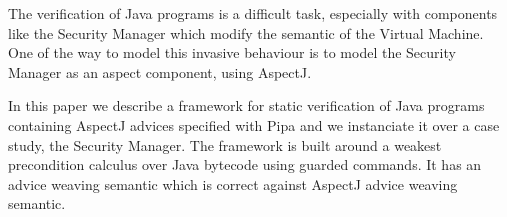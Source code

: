 The verification of Java programs is a difficult task, especially with
components like the Security Manager which modify the semantic of the
Virtual Machine.  One of the way to model this invasive behaviour is
to model the Security Manager as an aspect component, using AspectJ.

In this paper we describe a framework for static verification of Java
programs containing AspectJ advices specified with Pipa and
we instanciate it over a case study, the Security Manager.  The
framework is built around a weakest precondition calculus over Java
bytecode using guarded commands. It has an advice weaving 
semantic which is correct against AspectJ advice weaving semantic.  


